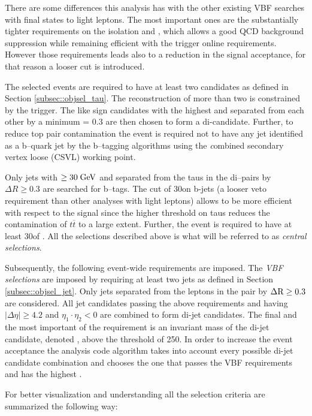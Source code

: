 There are some differences this analysis has with the other existing VBF searches with final states to light leptons. The most important ones are the substantially tighter requirements on the \hadtau isolation and \pt, which allows a good QCD background suppression while remaining efficient with the trigger online requirements. However those requirements leads also to a reduction in the signal acceptance, for that reason a looser \met cut is introduced.

The selected events are required to have at least two \hadtau candidates as defined in Section \ref{subsec::objsel_tau}. The reconstruction of more than two \hadtau is constrained by the trigger. The like sign \hadtau candidates with the highest \pt and separated from each other by a minimum \deltar = 0.3 are then chosen to form a di-\hadtau candidate. 
Further, to reduce top pair contamination the event is required not to have any jet identified as a b--quark jet by the b--tagging algorithms using the {\textit combined secondary vertex loose} (CSVL) working point. 

Only jets with \pt $\ge 30\;\text{Ge}\kern-0.06667em\text{V}$ and separated from the taus in the di--\hadtau pairs by $\Delta R \ge 0.3$ are searched for b--tags. The \pt cut of 30\gev on b-jets (a looser veto requirement than other analyses with light leptons) allows to be more efficient with respect to the signal since the higher \pt threshold on taus reduces the contamination of $t\overline{t}$ to a large extent. Further, the event is required to have at least 30\gev of \met. All the selections described above is what will be referred to as \textit{central selections}.

Subsequently, the following event-wide requirements are imposed. The {\textit {VBF selections}} are imposed by requiring at least two jets as defined in Section \ref{subsec::objsel_jet}. Only jets separated from the leptons in the \hadtau\hadtau pair by $\Delta \text{R} \ge 0.3$ are considered. All jet candidates passing the above requirements and having $\vert \Delta\eta \vert \ge 4.2$ and $\eta_{1}\cdot\eta_{2} < 0$ are combined to form di-jet candidates. The final and the most important of the requirement is an invariant mass of the di-jet candidate, denoted \mjj, above the threshold of 250\gev. In order to increase the event acceptance the analysis code algorithm takes into account every possible di-jet candidate combination and chooses the one that passes the VBF requirements and has the highest \mjj. 

For better visualization and understanding all the selection criteria are summarized the following way:

